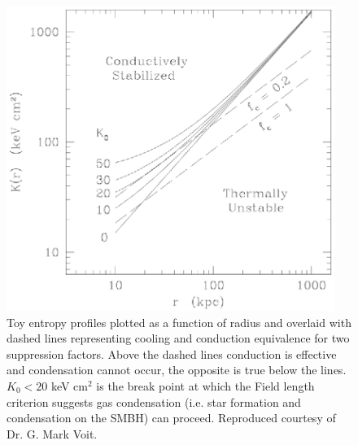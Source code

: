 \documentclass[11pt]{article}
\begin{document}
\begin{figure}[t]
\begin{minipage}[t]{0.5\linewidth}
        \includegraphics*[width=0.95\textwidth, trim=0mm 0mm 0mm 0mm, clip]{conduction}
        \caption{\small 
	Toy entropy profiles plotted as a function of radius and overlaid with
	dashed lines representing cooling and conduction equivalence for two
	suppression factors. Above the dashed lines conduction is effective
	and condensation cannot occur, the opposite is true below the
	lines. $K_0 < 20$ keV cm$^2$ is the break point at which the Field
	length criterion suggests gas condensation (i.e. star formation and
	condensation on the SMBH) can proceed. Reproduced courtesy of Dr. G.
	Mark Voit.}
        \label{fig:conduction}
    \end{minipage}
\end{figure}
\end{document}
